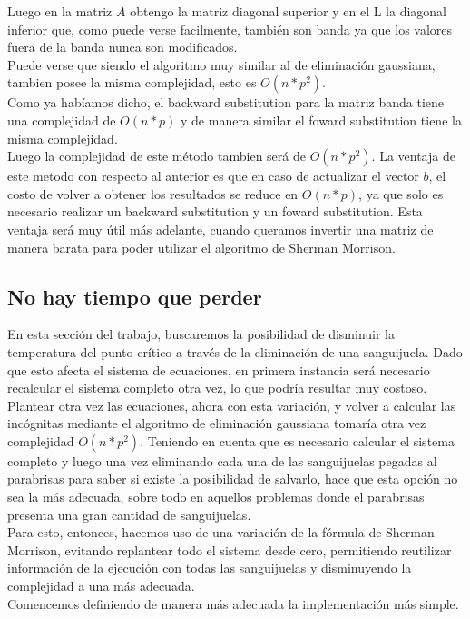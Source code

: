 Luego en la matriz $A$ obtengo la matriz diagonal superior y en el L la diagonal inferior que, como puede verse facilmente, también son banda ya que los valores fuera de la banda nunca son modificados.
\\
Puede verse que siendo el algoritmo muy similar al de eliminación gaussiana, tambien posee la misma complejidad, esto es $O(n*p^2)$.
\\
Como ya habíamos dicho, el backward substitution para la matriz banda tiene una complejidad de $O(n*p)$ y de manera similar el foward substitution tiene la misma complejidad.
\\
Luego la complejidad de este método tambien será de $O(n*p^2)$. La ventaja de este metodo con respecto al anterior es que en caso de actualizar el vector $b$, el costo de volver a obtener los resultados se reduce en $O(n*p)$, ya que solo es necesario realizar un backward substitution y un foward substitution. Esta ventaja será muy útil más adelante, cuando queramos invertir una matriz de manera barata para poder utilizar el algoritmo de Sherman Morrison.

\subsection{No hay tiempo que perder}

En esta sección del trabajo, buscaremos la posibilidad de disminuir la temperatura del punto crítico a través de la eliminación de una sanguijuela. Dado que esto afecta el sistema de ecuaciones, en primera instancia será necesario recalcular el sistema completo otra vez, lo que podría resultar muy costoso.
\\
Plantear otra vez las ecuaciones, ahora con esta variación, y volver a calcular las incógnitas mediante el algoritmo de eliminación gaussiana tomaría otra vez complejidad $O(n*p^2)$. Teniendo en cuenta que es necesario calcular el sistema completo y luego una vez eliminando cada una de las sanguijuelas pegadas al parabrisas para saber si existe la posibilidad de salvarlo, hace que esta opción no sea la más adecuada, sobre todo en aquellos problemas donde el parabrisas presenta una gran cantidad de sanguijuelas.
\\
Para esto, entonces, hacemos uso de una variación de la fórmula de Sherman–Morrison, evitando replantear todo el sistema desde cero, permitiendo reutilizar información de la ejecución con todas las sanguijuelas y disminuyendo la complejidad a una más adecuada.
\\
Comencemos definiendo de manera más adecuada la implementación más simple.

